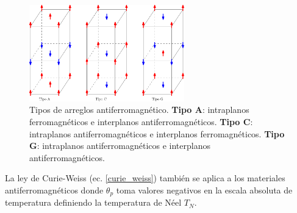 \begin{figure}[H]
    \centering
    \includegraphics[width=0.6\textwidth]{contenido/marco_teorico/materiales_multiferroicos/img_MaterialesMultiferroicos/tipos_antiferro.png}
    \caption[Tipos de antiferromagnetismo]{Tipos de arreglos 
    antiferromagn\'etico. {\bf Tipo A}: 
        intraplanos ferromagn\'eticos e interplanos antiferromagn\'eticos. {\bf 
        Tipo C}: intraplanos
        antiferromagn\'eticos e interplanos
        ferromagn\'eticos. {\bf Tipo G}: intraplanos antiferromagn\'eticos e 
        interplanos antiferromagn\'eticos.}
    \label{antiferro}
\end{figure}

\noindent La ley de Curie-Weiss (ec. \ref{curie_weiss}) tambi\'en se aplica a los materiales antiferromagn\'eticos donde $\theta _{p}$ toma valores negativos en la escala absoluta de temperatura definiendo la temperatura de N\'eel $T_{N}$.
